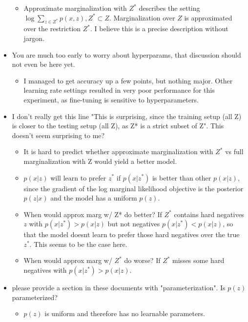 \documentclass[11pt]{article}
\begin{document}
\begin{itemize}
    \begin{itemize}
    \item Approximate marginalization with $Z^*$ describes the setting $\log\sum_{z\in Z^*} p(x,z), Z^*\subset Z$.
        Marginalization over $Z$ is approximated over the restriction $Z^*$.
        I believe this is a precise description without jargon.
    \end{itemize}
\item You are much too early to worry about hyperparams, that discussion should not even be here yet.
    \begin{itemize}
    \item I managed to get accuracy up a few points, but nothing major. Other learning rate
        settings resulted in very poor performance for this experiment,
        as fine-tuning is sensitive to hyperparameters.
    \end{itemize}
\item I don't really get this line "This is surprising, since the training setup (all Z) is closer to the testing setup (all Z), as Z* is a strict subset of Z". This doesn't seem surprising to me?
    \begin{itemize}
    \item It is hard to predict whether approximate marginalization with $Z^*$
        vs full marginalization with Z would yield a better model.
    \item $p(x|z)$ will learn to prefer $z^*$ if $p(x|z^*)$ is better than other $p(x|z)$,
        since the gradient of the log marginal likelihood objective is the posterior $p(z|x)$
        and the model has a uniform $p(z)$.
    \item When would approx marg w/ Z* do better?
        If $Z^*$ contains hard negatives $z$ with $p(x | z^*) > p(x | z)$ but not negatives $p(x | z^*) < p(x | z)$,
        so that the model doesnt learn to prefer those hard negatives over the true $z^*$.
        This seems to be the case here.
    \item When would approx marg w/ $Z^*$ do worse?
        If $Z^*$ misses some hard negatives with $p(x | z^*) > p(x | z)$.
    \end{itemize}
\item please provide a section in these documents with "parameterization". Is $p(z)$ parameterized?
    \begin{itemize}
    \item $p(z)$ is uniform and therefore has no learnable parameters.
    \end{itemize}
\end{itemize}
\end{document}
